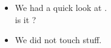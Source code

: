 \begin{itemize}
\item We had a quick look at . \\ 
      is it ?

\item We did not touch  stuff. \\ 

\end{itemize}
